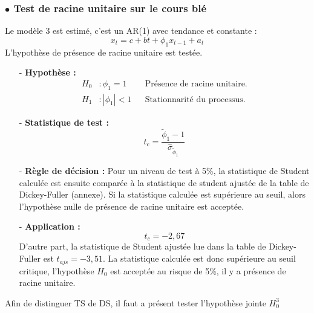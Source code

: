 \subsubsection*{$\bullet$ Test de racine unitaire sur le cours blé}
Le modèle 3 est estimé, c'est un AR(1) avec tendance et constante :
\begin{equation*}
    x_{t} = c + bt + \phi_{1} x_{t-1} + a_{t}
\end{equation*}
L'hypothèse de présence de racine unitaire est testée.
%
\begin{itemize}
\item[-]\textbf{ Hypothèse :} 
\begin{align*}
    H_{0} &: \phi_{1} = 1  & &\text{Présence de racine unitaire.}\\
    H_{1} &:|\phi_{1}| < 1   &  &\text{Stationnarité du processus.}
\end{align*}
\item[-]\textbf{Statistique de test :} 
\begin{equation*}
    t_{c} = \frac{\tilde{\phi}_{1}- 1}{\hat{\sigma}_{\tilde{\phi}_{1}}}
\end{equation*}
\item[-]\textbf{Règle de décision :} Pour un niveau de test à 5\%, la statistique de Student calculée est ensuite comparée à la statistique de student ajustée de la table 
de Dickey-Fuller (annexe). Si la statistique calculée est supérieure au seuil, alors l'hypothèse nulle de présence de racine unitaire est acceptée.
\item[-]\textbf{Application :} 
\begin{equation*}
    t_{c} = -2,67
\end{equation*}
D'autre part, la statistique de Student ajustée lue dans la table de Dickey-Fuller est $t_{ajs} = - 3,51$. La statistique calculée est donc supérieure au seuil critique,
l'hypothèse $H_{0}$ est acceptée au risque de 5\%, il y a présence de racine unitaire.
\end{itemize}
%
Afin de distinguer TS de DS, il faut a présent tester l'hypothèse jointe $H_{0}^{3}$
%
